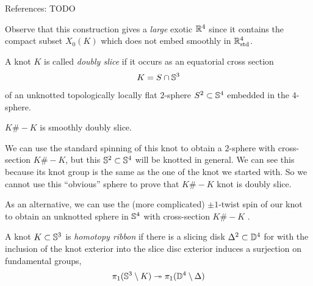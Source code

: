 \begin{remark}
	References:
	\citep{57926}
	TODO
	
	Observe that this construction gives a \textit{large}
	exotic $\mathbb{R}^{4}$ since it contains the compact subset
	$X_{0}(K)$ which does not embed smoothly in
	$\mathbb{R}^{4}_{\mathrm{std}}$.
\end{remark}


\begin{definition}
	A knot $K$ is called \textit{doubly slice} 
	if it occurs as an
	equatorial cross section
	\[
		K = S \cap \mathbb{S}^{3}
	\]
	of an unknotted topologically locally flat
	$2$-sphere $S^{2} \subset \mathbb{S}^{4}$
	embedded in the $4$-sphere.
\end{definition}

\begin{lemma}
	$K \# -K$ is smoothly doubly slice.
\end{lemma}

\begin{remark}
	We can use the standard spinning of this knot to obtain a $2$-sphere
	with cross-section $K \# -K$, but this $\mathbb{S}^{2} \subset \mathbb{S}^{4}$
	will be knotted in general.
	We can see this because its knot group 
	is the same as the one of the knot we started with.
	So we cannot use this ``obvious'' sphere to prove that $ K \# -K $ knot is doubly slice.
	
	As an alternative, we can use the (more complicated)
	$\pm 1$-twist spin of our knot to obtain an unknotted
	sphere in $\mathbb{S}^{4}$ with cross-section
	$K \# -K$ \citep{zeeman1965twisting}.
	
\end{remark}


\begin{definition}
	A knot $K \subset \mathbb{S}^{3}$ is \textit{homotopy ribbon} 
	if there is a slicing disk $\Delta^{2} \subset \mathbb{D}^{4}$
	for with the inclusion of the knot exterior into
	the slice disc exterior induces a surjection on fundamental groups,
	\begin{equation*}
		\pi_1( \mathbb{S}^{3} \setminus K )
		\twoheadrightarrow
		\pi_1( \mathbb{D}^{4} \setminus \Delta )
	\end{equation*}
\end{definition}


